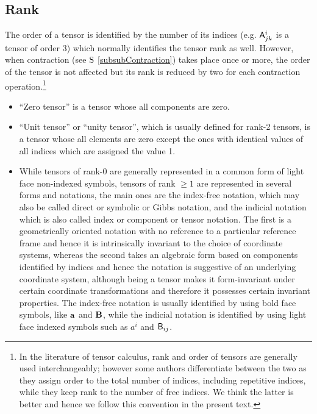 \subsection{Rank}
The order of a tensor is identified by the number of its
indices (e.g. $\tsor{A}_{jk}^{i}$ is a tensor of order 3) which normally
identifies the tensor rank as well. However, when contraction (see
$\S$ \ref{subsubContraction}) takes place once or more, the order
of the tensor is not affected but its rank is reduced by two for each
contraction operation.\footnote{In the literature of tensor calculus, rank and order of tensors are
generally used interchangeably; however some authors differentiate
between the two as they assign order to the total number of indices,
including repetitive indices, while they keep rank to the number of
free indices. We think the latter is better and hence we follow this
convention in the present text.}

\begin{itemize}
\item ``Zero tensor'' is a tensor whose all components are
zero.
\item ``Unit tensor'' or ``unity tensor'', which is usually
defined for rank-2 tensors, is a tensor whose all elements are zero
except the ones with identical values of all indices which are assigned
the value 1.
\item  While tensors of rank-0 are generally represented in a
common form of light face non-indexed symbols, tensors of rank $\ge1$
are represented in several forms and notations, the main ones are
the index-free notation, which may also be called direct or symbolic
or Gibbs notation, and the indicial notation which is also called
index or component or tensor notation. The first is a geometrically
oriented notation with no reference to a particular reference frame
and hence it is intrinsically invariant to the choice of coordinate
systems, whereas the second takes an algebraic form based on components
identified by indices and hence the notation is suggestive of an underlying
coordinate system, although being a tensor makes it form-invariant
under certain coordinate transformations and therefore it possesses
certain invariant properties. The index-free notation is usually identified
by using bold face symbols, like $\vector{a}$ and $\vector{B}$,
while the indicial notation is identified by using light face indexed
symbols such as $a^{i}$ and $\tsor{B}_{ij}$.
\end{itemize}



